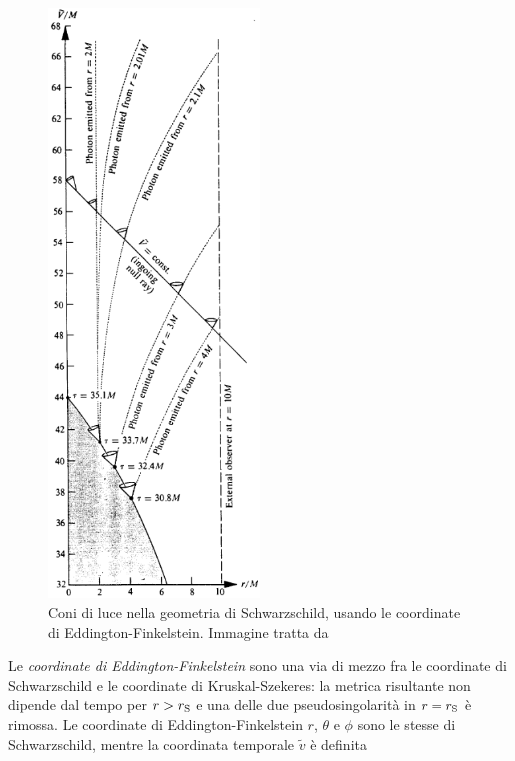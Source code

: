 \begin{figure}
  \centering
  \includegraphics[width=0.5\textwidth]{figure/eddington}
  \caption[Coni di luce nella geometria di Schwarzschild, usando le coordinate
  di Eddington-Finkelstein]{Coni di luce nella geometria di Schwarzschild,
    usando le coordinate di Eddington-Finkelstein.  Immagine tratta
    da~\textcite[849]{misner:gravitation}}
  \label{fig:coni-eddington}
\end{figure}
Le \emph{coordinate di
  Eddington-Finkelstein} sono una via di mezzo fra le coordinate di
Schwarzschild e le coordinate di Kruskal-Szekeres: la metrica risultante non
dipende dal tempo per \(r > r_{\textup{S}}\) e una delle due pseudosingolarità
in \(r = r_{\textup{S}}\) è rimossa.  Le coordinate di Eddington-Finkelstein
\(r\), \(\theta\) e \(\phi\) sono le stesse di Schwarzschild, mentre la
coordinata temporale \(\tilde{v}\) è definita
